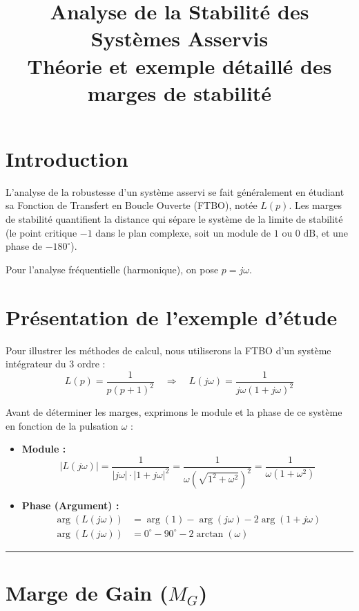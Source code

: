 \documentclass[12pt, a4paper]{article}
\title{\textbf{Analyse de la Stabilité des Systèmes Asservis}\\ \large Théorie et exemple détaillé des marges de stabilité}
\author{}
\date{}
\begin{document}
\maketitle

\section*{Introduction}
L'analyse de la robustesse d'un système asservi se fait généralement en étudiant sa Fonction de Transfert en Boucle Ouverte (FTBO), notée $L(p)$. Les marges de stabilité quantifient la distance qui sépare le système de la limite de stabilité (le point critique $-1$ dans le plan complexe, soit un module de $1$ ou $0 \text{ dB}$, et une phase de $-180^\circ$).

Pour l'analyse fréquentielle (harmonique), on pose $p = j\omega$.

\section*{Présentation de l'exemple d'étude}
Pour illustrer les méthodes de calcul, nous utiliserons la FTBO d'un système intégrateur du 3 ordre :
\begin{equation*}
    L(p) = \frac{1}{p(p+1)^2} \quad \Longrightarrow \quad L(j\omega) = \frac{1}{j\omega(1+j\omega)^2}
\end{equation*}

Avant de déterminer les marges, exprimons le module et la phase de ce système en fonction de la pulsation $\omega$ :
\begin{itemize}
    \item \textbf{Module :}
    \begin{equation*}
        |L(j\omega)| = \frac{1}{|j\omega| \cdot |1+j\omega|^2} = \frac{1}{\omega \left(\sqrt{1^2+\omega^2}\right)^2} = \frac{1}{\omega(1+\omega^2)}
    \end{equation*}
    \item \textbf{Phase (Argument) :}
    \begin{align*}
        \arg(L(j\omega)) &= \arg(1) - \arg(j\omega) - 2\arg(1+j\omega) \\
        \arg(L(j\omega)) &= 0^\circ - 90^\circ - 2\arctan(\omega)
    \end{align*}
\end{itemize}

\rule{\linewidth}{0.5pt}

\section{Marge de Gain ($M_G$)}
\end{document}
